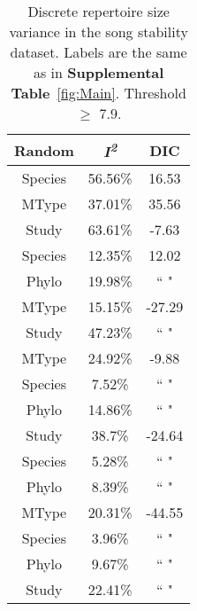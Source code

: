\documentclass{article}
\begin{document}
  \begin{table}[H]
  \centering
  \caption{Discrete repertoire size variance in the song stability dataset. Labels are the same as in \textbf{Supplemental Table}~\ref{fig:Main}. Threshold $\ge$ 7.9.} 
  \begin{tabular}{ccc}
  \hline
  Random & \textit{I\textsuperscript{2}} & DIC \\ 
  \hline
  Species & 56.56\% & 16.53 \\ \hdashline
  MType & 37.01\% & 35.56 \\ \hdashline
  Study & 63.61\% & -7.63 \\ \hdashline
  Species & 12.35\% & 12.02 \\ 
  Phylo & 19.98\% & `` " \\ \hdashline
  MType & 15.15\% & -27.29 \\ 
  Study & 47.23\% & `` " \\ \hdashline
  MType & 24.92\% & -9.88 \\ 
  Species & 7.52\% & `` " \\ 
  Phylo & 14.86\% & `` " \\ \hdashline
  Study & 38.7\% & -24.64 \\ 
  Species & 5.28\% & `` " \\ 
  Phylo & 8.39\% & `` " \\ \hdashline
  MType & 20.31\% & -44.55 \\ 
  Species & 3.96\% & `` " \\ 
  Phylo & 9.67\% & `` " \\ 
  Study & 22.41\% & `` " \\ 
  \hline
  \end{tabular}
  \end{table}
\end{document}

